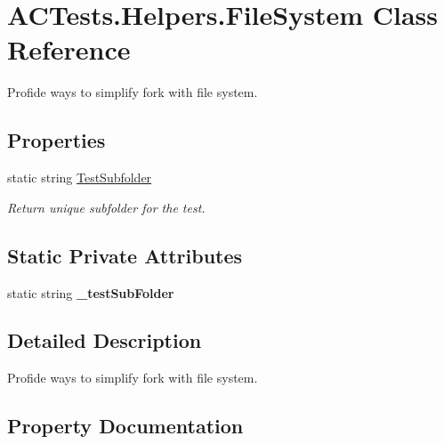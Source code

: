 \hypertarget{class_a_c_tests_1_1_helpers_1_1_file_system}{}\section{A\+C\+Tests.\+Helpers.\+File\+System Class Reference}
\label{class_a_c_tests_1_1_helpers_1_1_file_system}


Profide ways to simplify fork with file system.  


\subsection*{Properties}
\begin{DoxyCompactItemize}
\item 
static string \mbox{\hyperlink{class_a_c_tests_1_1_helpers_1_1_file_system_aa6957168fdab0f1b29016f3ea0024024}{Test\+Subfolder}}
\begin{DoxyCompactList}\small\item\em Return unique subfolder for the test. \end{DoxyCompactList}\end{DoxyCompactItemize}
\subsection*{Static Private Attributes}
\begin{DoxyCompactItemize}
\item 
\mbox{\label{class_a_c_tests_1_1_helpers_1_1_file_system_a2d1b5c9f6c48eb0678fb610136a5ed48}} 
static string {\bfseries \+\_\+test\+Sub\+Folder}
\end{DoxyCompactItemize}


\subsection{Detailed Description}
Profide ways to simplify fork with file system. 



\subsection{Property Documentation}
\mbox{\label{class_a_c_tests_1_1_helpers_1_1_file_system_aa6957168fdab0f1b29016f3ea0024024}} 
